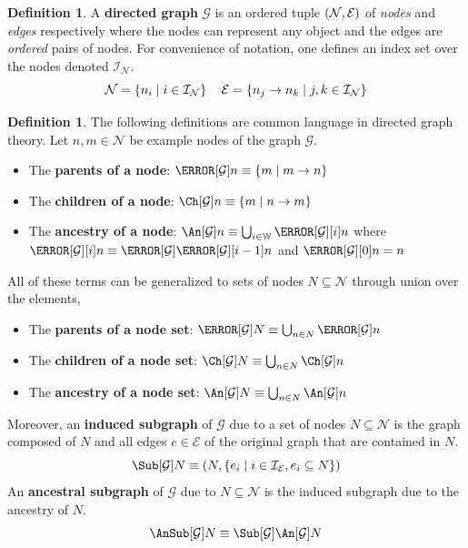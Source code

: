 \documentclass[aps, 10pt, english, twoside, pra, nofootinbib, longbibliography]{revtex4-1}
\theoremstyle{plain}
\theoremstyle{definition}
\newtheorem{definition}[theorem]{Definition}
\theoremstyle{remark}
\newcommand{\graph}{\mathcal{G}}
\newcommand{\nodes}{\mathcal{N}}
\newcommand{\edges}{\mathcal{E}}
\newcommand{\ind}{\mathcal{I}}
\newcommand{\term}[1]{\textcolor{Mahogany}{\textbf{#1}}}
\begin{document}
    \begin{definition}
        \label{def:directed_graph}
        A \term{directed graph} $\graph$ is an ordered tuple $\br{\nodes, \edges}$ of \textit{nodes} and \textit{edges} respectively where the nodes can represent any object and the edges are \textit{ordered} pairs of nodes. For convenience of notation, one defines an index set over the nodes denoted $\ind_\nodes$.
        \[ \nodes = \bc{n_i \mid i \in \ind_\nodes} \quad \edges = \bc{n_j \to n_k \mid j,k \in \ind_\nodes} \]
    \end{definition}

    \begin{definition}
        \label{def:graph_terms}
        The following definitions are common language in directed graph theory. Let $n, m \in \nodes$ be example nodes of the graph $\graph$.
        \begin{itemize}
            \item The \term{parents of a node}: $\Pa[\graph]{n} \defined \bc{m \mid m \to n}$
            \item The \term{children of a node}: $\Ch[\graph]{n} \defined \bc{m \mid n \to m}$
            \item The \term{ancestry of a node}: $\An[\graph]{n} \defined \bigcup_{i\in\mathbb{W}} \Pa[\graph][i]{n}$ where $\Pa[\graph][i]{n} \defined \Pa[\graph]{\Pa[\graph][i-1]{n}}$ and $\Pa[\graph][0]{n} = n$
        \end{itemize}
        All of these terms can be generalized to sets of nodes $N \subseteq \nodes$ through union over the elements,
        \begin{itemize}
            \item The \term{parents of a node set}: $\Pa[\graph]{N} \defined \bigcup_{n\in N}\Pa[\graph]{n}$
            \item The \term{children of a node set}: $\Ch[\graph]{N} \defined \bigcup_{n\in N}\Ch[\graph]{n}$
            \item The \term{ancestry of a node set}: $\An[\graph]{N} \defined \bigcup_{n\in N}\An[\graph]{n}$
        \end{itemize}
        Moreover, an \term{induced subgraph} of $\graph$ due to a set of nodes $N \subseteq \nodes$ is the graph composed of $N$ and all edges $e \in \edges$ of the original graph that are contained in $N$.
        \[ \Sub[\graph]{N} \defined \br{N, \bc{e_i \mid i \in \ind_\edges, e_i \subseteq N}}\]
        An \term{ancestral subgraph} of $\graph$ due to $N \subseteq \nodes$ is the induced subgraph due to the ancestry of $N$.
        \[ \AnSub[\graph]{N} \defined \Sub[\graph]{\An[\graph]{N}} \]
    \end{definition}
\end{document}
